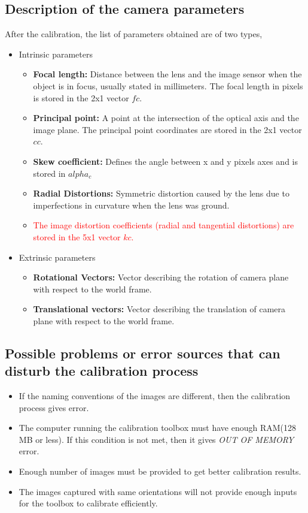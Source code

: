 \documentclass[11pt,a4paper]{article}
\begin{document}
\subsection{Description of the camera parameters}
After the calibration, the list of parameters obtained are of two types,
\begin{itemize}
\item Intrinsic parameters
\begin{itemize}
\item \textbf{Focal length:} Distance between the lens and the image sensor when the object is in focus, usually stated in millimeters. The focal length in pixels is stored in the 2x1 vector $fc$. 
\item \textbf{Principal point:} A point at the intersection of the optical axis and the image plane. The principal point coordinates are stored in the 2x1 vector $cc$.
\item \textbf{Skew coefficient:} Defines the angle between x and y pixels axes and is stored in $alpha_c$
\item \textbf{Radial Distortions:} Symmetric distortion caused by the lens due to imperfections in curvature when the lens was ground.
\item \textcolor{red}{The image distortion coefficients (radial and tangential distortions) are stored in the 5x1 vector $kc$.}
\end{itemize}
\item Extrinsic parameters
\begin{itemize}
\item \textbf{Rotational Vectors:} Vector describing the rotation of camera plane with respect to the world frame.
\item \textbf{Translational vectors:} Vector describing the translation of camera plane with respect to the world frame.
\end{itemize}
\end{itemize}

\subsection{Possible problems or error sources that can disturb the calibration process}
\begin{itemize}
\item If the naming conventions of the images are different, then the calibration process gives error.
\item The computer running the calibration toolbox must have enough RAM(128 MB or less). If this condition is not met, then it gives \textit{OUT OF MEMORY} error.
\item Enough number of images must be provided to get better calibration results.
\item The images captured with same orientations will not provide enough inputs for the toolbox to calibrate efficiently.
\end{itemize}
\end{document}
